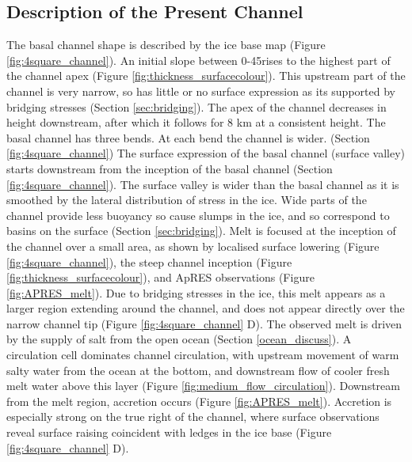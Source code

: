 \subsection{Description of the Present Channel}
The basal channel shape is described by the ice base map (Figure \ref{fig:4square_channel}). An initial slope between 0-45\textdegree rises to the highest part of the channel apex (Figure \ref{fig:thickness_surfacecolour}). This upstream part of the channel is very narrow, so has little or no surface expression as its supported by bridging stresses (Section \ref{sec:bridging}). The apex of the channel decreases in height downstream, after which it follows for 8 km at a consistent height.
The basal channel has three bends. At each bend the channel is wider. (Section \ref{fig:4square_channel}) 
The surface expression of the basal channel (surface valley) starts downstream from the inception of the basal channel (Section \ref{fig:4square_channel}). The surface valley is wider than the basal channel as it is smoothed by the lateral distribution of stress in the ice. Wide parts of the channel provide less buoyancy so cause slumps in the ice, and so correspond to basins on the surface (Section \ref{sec:bridging}).
Melt is focused at the inception of the channel over a small area, as shown by localised surface lowering (Figure \ref{fig:4square_channel}), the steep channel inception (Figure \ref{fig:thickness_surfacecolour}), and ApRES observations (Figure \ref{fig:APRES_melt}). Due to bridging stresses in the ice, this melt appears as a larger region extending around the channel, and does not appear directly over the narrow channel tip  (Figure \ref{fig:4square_channel} D). 
The observed melt is driven by the supply of salt from the open ocean (Section \ref{ocean_discuss}). A circulation cell dominates channel circulation, with upstream movement of warm salty water from the ocean at the bottom, and downstream flow of cooler fresh melt water above this layer (Figure \ref{fig:medium_flow_circulation}). 
Downstream from the melt region, accretion occurs (Figure \ref{fig:APRES_melt}).
Accretion is especially strong on the true right of the channel, where surface observations reveal surface raising coincident with ledges in the ice base (Figure \ref{fig:4square_channel} D). 


